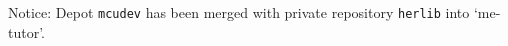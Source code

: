 
Notice: Depot \verb`mcudev` has been merged with private repository \verb`herlib` into `me-tutor'.

